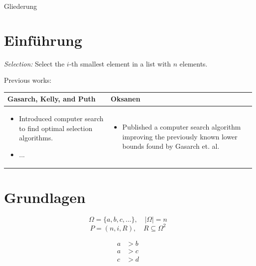
\begin{frame}{Gliederung}
  \tableofcontents
\end{frame}


\section{Einführung}
\begin{frame}{\insertsection}
  \textit{Selection:} Select the $i$-th smallest element in a list with $n$ elements.

  \vspace{5mm}
  Previous works:

  \vspace{5mm}
  \begin{tabular}{|p{5cm}|p{5cm}|}
    \hline
    Gasarch, Kelly, and Puth                                               & Oksanen   \\
    \hline
    \raggedright \begin{itemize}
                   \item Introduced computer search to find optimal selection algorithms.
                   \item ...
                 \end{itemize} &
    \raggedright \begin{itemize}
                   \item Published a computer search algorithm improving the previously known lower bounds found
                         by Gasarch et. al.
                 \end{itemize}
  \end{tabular}
\end{frame}


\section{Grundlagen}
\sectionframe{\insertsection}
\begin{frame}{\insertsection}
  $$ \Omega = \{ a,b,c,...\}, \quad |\Omega| = n $$
  $$P = (n,i,R), \quad R \subseteq \Omega^2$$
\end{frame}

\begin{frame}{\insertsection}
  \centering

  \begin{align*}
    a & > b \\
    a & > c \\
    c & > d
  \end{align*}
\end{frame}

